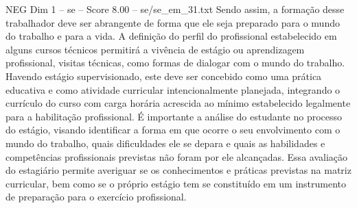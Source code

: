 \begin{textsample}{NEG Dim 1 – se – Score 8.00 – se/se\_em\_31.txt}
Sendo assim, a formação desse trabalhador deve ser abrangente de forma que ele seja preparado para o mundo do trabalho e para a vida.
A definição do perfil do profissional estabelecido em alguns cursos técnicos permitirá a vivência de estágio ou aprendizagem profissional, visitas técnicas, como formas de dialogar com o mundo do trabalho.
Havendo estágio supervisionado, este deve ser concebido como uma prática educativa e como atividade curricular intencionalmente planejada, integrando o currículo do curso com carga horária acrescida ao mínimo estabelecido legalmente para a habilitação profissional.
É importante a análise do estudante no processo do estágio, visando identificar a forma em que ocorre o seu envolvimento com o mundo do trabalho, quais dificuldades ele se depara e quais as habilidades e competências profissionais previstas não foram por ele alcançadas.
Essa avaliação do estagiário permite averiguar se os conhecimentos e práticas previstas na matriz curricular, bem como se o próprio estágio tem se constituído em um instrumento de preparação para o exercício profissional.

\end{textsample}
